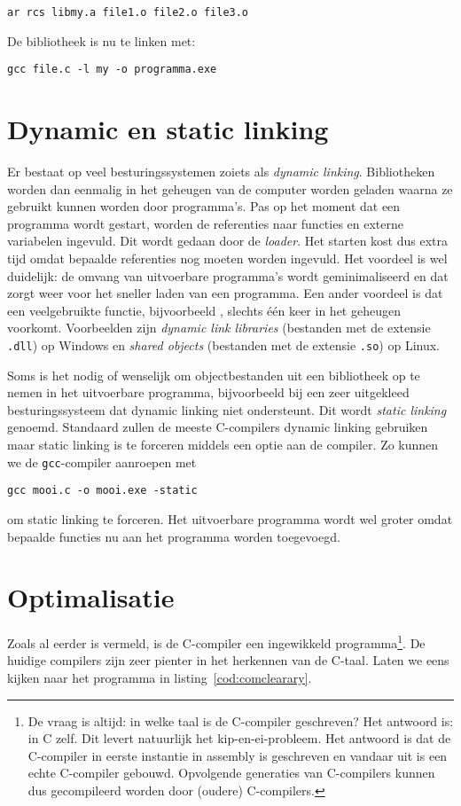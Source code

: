 \hspace*{1em}\texttt{ar rcs libmy.a file1.o file2.o file3.o}

De bibliotheek is nu te linken met:

\hspace*{1em}\texttt{gcc file.c -l my -o programma.exe}


\section{Dynamic en static linking}
Er bestaat op veel besturingssystemen zoiets als \textsl{dynamic linking}. Bibliotheken worden dan eenmalig in het geheugen van de computer worden geladen waarna ze gebruikt kunnen worden door programma's. Pas op het moment dat een programma wordt gestart, worden de referenties naar functies en externe variabelen ingevuld. Dit wordt gedaan door de \textsl{loader}. Het starten kost dus extra tijd omdat bepaalde referenties nog moeten worden ingevuld. Het voordeel is wel duidelijk: de omvang van uitvoerbare programma's wordt geminimaliseerd en dat zorgt weer voor het sneller laden van een programma. Een ander voordeel is dat een veelgebruikte functie, bijvoorbeeld , slechts één keer in het geheugen voorkomt. Voorbeelden zijn \textsl{dynamic link libraries} (bestanden met de extensie \texttt{.dll}) op Windows en \textsl{shared objects} (bestanden met de extensie \texttt{.so}) op Linux. 

Soms is het nodig of wenselijk om objectbestanden uit een bibliotheek op te nemen in het uitvoerbare programma, bijvoorbeeld bij een zeer uitgekleed besturingssysteem dat dynamic linking niet ondersteunt. Dit wordt \textsl{static linking} genoemd. Standaard zullen de meeste C-compilers dynamic linking gebruiken maar static linking is te forceren middels een optie aan de compiler. Zo kunnen we de \texttt{gcc}-compiler aanroepen met

\begin{lstlisting}[style=lstoneline]
gcc mooi.c -o mooi.exe -static
\end{lstlisting}

om static linking te forceren. Het uitvoerbare programma wordt wel groter omdat bepaalde functies nu aan het programma worden toegevoegd.


\section{Optimalisatie}
Zoals al eerder is vermeld, is de C-compiler een ingewikkeld programma\footnote{De vraag is altijd: in welke taal is de C-compiler geschreven? Het antwoord is: in C zelf. Dit levert natuurlijk het kip-en-ei-probleem. Het antwoord is dat de C-compiler in eerste instantie in assembly is geschreven en vandaar uit is een echte C-compiler gebouwd. Opvolgende generaties van C-compilers kunnen dus gecompileerd worden door (oudere) C-compilers.}. De huidige compilers zijn zeer pienter in het herkennen van de C-taal. Laten we eens kijken naar het programma in listing~\ref{cod:comclearary}.

